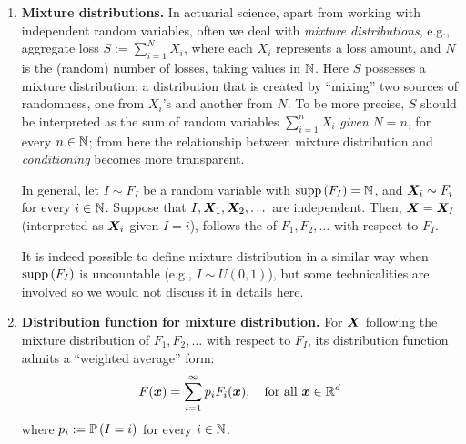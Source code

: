 \begin{enumerate}
\item \textbf{Mixture distributions.} In actuarial science, apart from working
with independent random variables, often we deal with \emph{mixture
distributions}, e.g., aggregate loss \(S:=\sum_{i=1}^{N}X_i\), where each
\(X_i\) represents a loss amount, and \(N\) is the (random) number of losses, taking
values in \(\mathbb{N}\). Here \(S\) possesses a mixture distribution: a distribution
that is created by ``mixing'' two sources of randomness, one from \(X_i\)'s and
another from \(N\).  To be more precise, \(S\) should be interpreted as the sum
of random variables \(\sum_{i=1}^{n}X_i\) \emph{given} \(N=n\), for every \(n\in\mathbb{N}\);
from here the relationship between mixture distribution and \emph{conditioning}
becomes more transparent.

In general, let \(I\sim F_I\) be a random variable with \(\operatorname{supp}\left(F_I\right)=\mathbb{N}\),
and \(\bm{X}_i\sim F_i\) for every \(i\in\mathbb{N}\). Suppose that
\(I,\bm{X}_1,\bm{X}_2,\dotsc\) are independent. Then,
\(\bm{X}=\bm{X}_{I}\) (interpreted as \(\bm{X}_i\) given \(I=i\)),
follows the  of \(F_1,F_2,\dotsc\) with respect to
\(F_{I}\).

\begin{note}
It is indeed possible to define mixture distribution in a similar way when
\(\operatorname{supp}\left(F_I\right)\) is uncountable (e.g., \(I\sim U(0,1)\)), but some technicalities
are involved so we would not discuss it in details here.
\end{note}

\item\label{it:mixture-df} \textbf{Distribution function for mixture distribution.}
For \(\bm{X}\) following the mixture distribution of \(F_1,F_2,\dotsc\) with
respect to \(F_{I}\), its distribution function admits a ``weighted average''
form:
\[
F(\bm{x})=\sum_{i=1}^{\infty}p_iF_i(\bm{x}),\quad\text{for all \(\bm{x}\in\mathbb{R}^d\)}
\]
where \(p_i:=\mathbb{P}\left(I=i\right)\) for every \(i\in\mathbb{N}\).


\end{enumerate}
